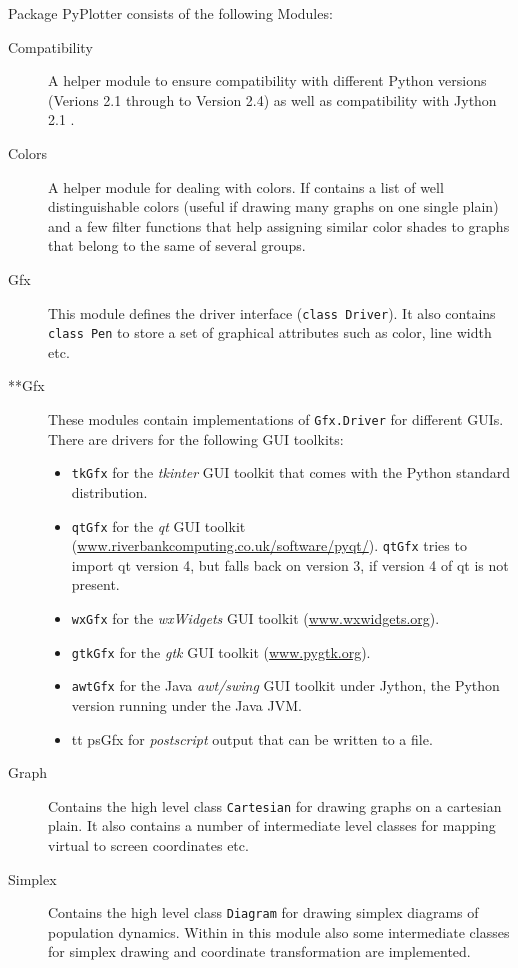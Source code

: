 \documentclass[12pt,a4paper,USenglish]{article}
\begin{document}
Package PyPlotter consists of the following Modules: 

\begin{description}

\item[Compatibility] A helper module to ensure compatibility
with different Python versions (Verions 2.1 through to Version 2.4) as
well as compatibility with Jython 2.1 .  

\item[Colors] A helper module for dealing with colors. If contains a
list of well distinguishable colors (useful if drawing many graphs on
one single plain) and a few filter functions that help assigning
similar color shades to graphs that belong to the same of several
groups.  

\item[Gfx] This module defines the driver interface
({\tt class Driver}). It also contains {\tt class Pen} to store a set 
of graphical attributes such as color, line width etc.

\item[**Gfx] These modules contain implementations of 
{\tt Gfx.Driver} for different GUIs. There are drivers for the following GUI
toolkits: 
  \begin{itemize}
    \item {\tt tkGfx} for the {\em tkinter} GUI toolkit that
          comes with the Python standard distribution.
    \item {\tt qtGfx} for the {\em qt} GUI toolkit
          (\url{www.riverbankcomputing.co.uk/software/pyqt/}).
          {\tt qtGfx} tries to import qt version 4, but falls
          back on version 3, if version 4 of qt is not present. 
    \item {\tt wxGfx} for the {\em wxWidgets} GUI
          toolkit (\url{www.wxwidgets.org}). 
    \item {\tt gtkGfx} for the {\em gtk} GUI toolkit (\url{www.pygtk.org}).
    \item {\tt awtGfx} for the Java {\em awt/swing} GUI toolkit under Jython,
          the Python version running under the Java JVM.
    \item {tt psGfx} for {\em postscript} output that can be written
          to a file.
  \end{itemize}

\item[Graph] Contains the high level class {\tt Cartesian} for drawing
  graphs on a cartesian plain. It also contains a number of
  intermediate level classes for mapping virtual to screen coordinates
  etc.

\item[Simplex] Contains the high level class {\tt Diagram} for drawing
  simplex diagrams of population dynamics. Within in this module also
  some intermediate classes for simplex drawing and coordinate
  transformation are implemented.

\end{description}
\end{document}
